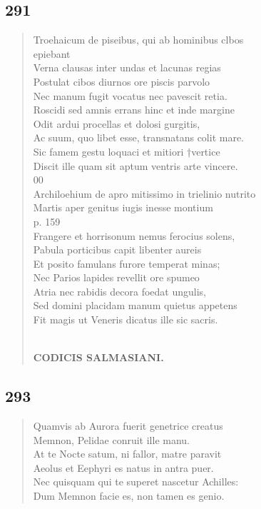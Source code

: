 \documentclass[11pt, a4paper]{report}
\begin{document}
            \subsection*{291}
      \begin{verse}
      Troehaicum de piseibus, qui ab hominibus clbos \\ epiebant \\ Verna clausas inter undas et lacunas regias \\ Postulat cibos diurnos ore piscis parvolo \\ Nec manum fugit vocatus nec pavescit retia. \\ Roscidi sed amnis errans hinc et inde margine \\ Odit ardui procellas et dolosi gurgitis, \\ Ac suum, quo libet esse, transnatans colit mare. \\ Sic famem gestu loquaci et mitiori †vertice \\ Discit ille quam sit aptum ventris arte vincere. \\ 00 \\ Archiloehium de apro mitissimo in trielinio nutrito \\ Martis aper genitus iugis inesse montium \\ p. 159 \\ Frangere  \lbrack et \rbrack  horrisonum nemus ferocius solens, \\ Pabula porticibus capit libenter aureis \\ Et posito famulans furore temperat minas; \\ Nec Parios lapides revellit ore spumeo \\ Atria nec rabidis decora foedat ungulis, \\ Sed domini placidam manum quietus appetens \\ Fit magis ut Veneris dicatus ille sic sacris. \\ 
        ﻿\pagebreak 
    \begin{center} \textbf{CODICIS SALMASIANI.} \end{center} \marginpar{[01]} 
      \end{verse}
  
            \subsection*{293}
      \begin{verse}
      Quamvis ab Aurora fuerit genetrice creatus \\ Memnon, Pelidae conruit ille manu. \\ At te Nocte satum, ni fallor, matre paravit \\ Aeolus et Eephyri es natus in antra puer. \\ Nec quisquam qui te superet nascetur Achilles: \\ Dum Memnon facie es, non tamen es genio. \\ 
      \end{verse}
  
\end{document}

